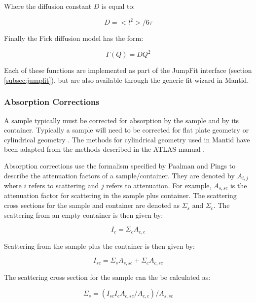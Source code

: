 \documentclass[paper=a4, fontsize=11pt]{scrartcl}	%
\numberwithin{equation}{section}															%
\numberwithin{figure}{section}																%
\numberwithin{table}{section}																%
\begin{document}
Where the diffusion constant $D$ is equal to:

\begin{equation}
D=<l^2>/6\tau
\end{equation}

Finally the Fick diffusion model \cite{fick1855v} has the form:

\begin{equation}
\Gamma(Q) = DQ^2
\end{equation}

Each of these functions are implemented as part of the JumpFit interface (section \ref{subsec:jumpfit}), but are also available through the generic fit wizard in Mantid.

\subsubsection{Absorption Corrections}
A sample typically must be corrected for absorption by the sample and by its container. Typically a sample will need to be corrected for flat plate geometry \cite{ccarlile1974} or cylindrical geometry \cite{aksoper1989}. The methods for cylindrical geometry used in Mantid have been adapted from the methods described in the ATLAS manual \cite{aksoper1989}.

Absorption corrections use the formalism specified by Paalman and Pings \cite{hhpaalman1962} to describe the attenuation factors of a sample/container. They are denoted by $A_{i,j}$ where $i$ refers to scattering and $j$ refers to attenuation. For example, $A_{s,sc}$ is the attenuation factor for scattering in the sample plus container. The scattering cross sections for the sample and container are denoted as $\Sigma_s$ and $\Sigma_c$. The scattering from an empty container is then given by:

\begin{equation}
I_c = \Sigma_c A_{c,c}
\end{equation}

Scattering from the sample plus the container is then given by:

\begin{equation}
I_{sc} = \Sigma_s A_{s,sc} + \Sigma_c A_{c,sc}
\end{equation}

The scattering cross section for the sample can the be calculated as:

\begin{equation}
\Sigma_s = (I_{sc}I_cA_{c,sc}/A_{c,c}) / A_{s,sc}
\end{equation}
\end{document}
